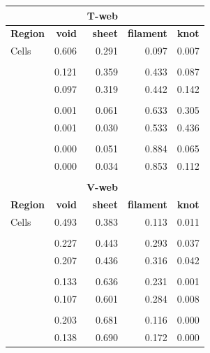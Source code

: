 \documentclass[usenatbib]{latex/mn2e}
\begin{document}
\begin{table}[H]
\begin{flushleft}
\begin{center}
  \begin{tabular}{l  r  r  r  r}
  	&&\textbf{T-web}&&\\\hline\hline
	\textbf{Region}	&\textbf{void}&\textbf{sheet}&\textbf{filament}&\textbf{knot}	\\\hline
	Cells			&	0.606	  &		0.291	 &		0.097	   &	0.007		\\
	&&&&\\	
	\GHFOF			& 	0.121	  &		0.359	 &		0.433	   &	0.087		\\
	\GHBDM			&	0.097	  &		0.319	 &		0.442	   &	0.142		\\
	&&&&\\	
	\IPFOF			&	0.001	  &		0.061	 &		0.633	   &	0.305		\\
	\IPBDM			&	0.001	  &		0.030	 &		0.533	   &	0.436		\\
	&&&&\\
	\RIPFOF			&	0.000	  &		0.051	 &		0.884	   &	0.065		\\
	\RIPBDM			&	0.000	  &		0.034	 &		0.853	   &	0.112		\\\hline\hline
	&&&&\\
  	&&\textbf{V-web}&&\\\hline\hline
	\textbf{Region}	&\textbf{void}&\textbf{sheet}&\textbf{filament}&\textbf{knot}	\\\hline
	Cells			&	0.493	  &		0.383	 &		0.113	   &	0.011		\\
	&&&&\\
	\GHFOF			&	0.227	  &		0.443	 &		0.293	   &	0.037		\\
	\GHBDM			&	0.207	  &		0.436	 &		0.316	   &	0.042		\\
	&&&&\\
	\IPFOF			&	0.133	  &		0.636	 &		0.231	   &	0.001		\\
	\IPBDM			&	0.107	  &		0.601	 &		0.284	   &	0.008		\\
	&&&&\\
	\RIPFOF			&	0.203	  &		0.681	 &		0.116	   &	0.000		\\
	\RIPBDM			&	0.138	  &		0.690	 &		0.172	   &	0.000		\\\hline\hline
  \end{tabular}  
  
  \label{tab:OccupationFractions}
  
\end{center}
\end{flushleft}
\end{table}
\end{document}
